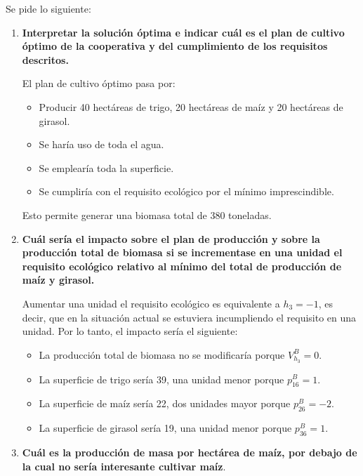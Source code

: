  
\bigskip
Se pide lo siguiente:
\begin{enumerate}[label=\alph*)]
    \item \textbf{Interpretar la solución óptima e indicar cuál es el plan de cultivo óptimo de la cooperativa y del cumplimiento de los requisitos descritos.}

    El plan de cultivo óptimo pasa por:
    \begin{itemize}
        \item Producir 40 hectáreas de trigo, 20 hectáreas de maíz y 20 hectáreas de girasol.
        \item Se haría uso de toda el agua.
        \item Se emplearía toda la superficie.
        \item Se cumpliría con el requisito ecológico por el mínimo imprescindible.
    \end{itemize}
    Esto permite generar una biomasa total de 380 toneladas.

    \item \textbf{Cuál sería el impacto sobre el plan de producción y sobre la producción total de biomasa si se incrementase en una unidad el requisito ecológico relativo al mínimo del total de producción de maíz y girasol.}

    Aumentar una unidad el requisito ecológico es equivalente a $h_3=-1$, es decir, que en la situación actual se estuviera incumpliendo el requisito en una unidad. Por lo tanto, el impacto sería el siguiente:

    \begin{itemize}
        \item La producción total de biomasa no se modificaría porque $V^B_{h_3}=0$.
        \item La superficie de trigo sería 39, una unidad menor porque $p^B_{16}=1$.
        \item La superficie de maíz sería 22, dos unidades mayor porque $p^B_{26}=-2$.
        \item La superficie de girasol sería 19, una unidad menor porque $p^B_{36}=1$.
    \end{itemize}
        

    \item \textbf{Cuál es la producción de masa por hectárea de maíz, por debajo de la cual no sería interesante cultivar maíz}.


\end{enumerate}
